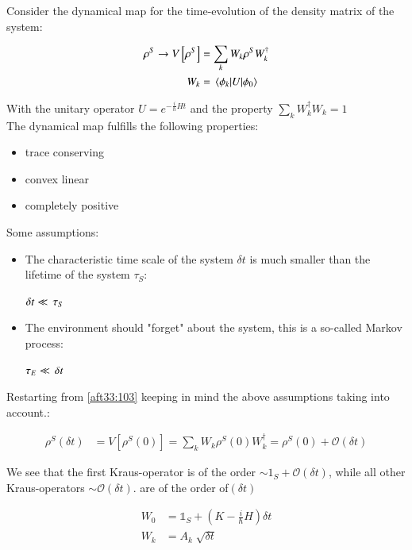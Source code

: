 Consider the dynamical map for the time-evolution of the density matrix of the system:

\begin{align}\label{aft33:103}
{ \rho  }^{ S }\rightarrow V\left[ { \rho  }^{ S } \right]&=\sum _{k}{{W}_{k}}{\rho}^{S}{W}_{k}^{\dagger  }\\
W_{k}&=\matrixel{\phi_{k}}{U}{\phi_{0}}
\end{align}

With the unitary operator $U =e^{-\frac{i}{h}Ht}$ and the property $\sum_{k}{W}_{k}^{\dagger}{W}_{k}=1$\\

The dynamical map fulfills the following properties:

\begin{itemize}
\item trace conserving
\item convex linear
\item completely positive
\end{itemize}
Some assumptions:

\begin{itemize}
\item The characteristic time scale of the system $\delta{t}$ is much smaller than the lifetime of the system $\tau_{S}$:
\begin{center}
$\delta{t}\ll \thinspace \tau_{S}$
\end{center}
\item The environment should "forget" about the system, this is a so-called Markov process:
\begin{center}
$\tau_{E}\ll \thinspace\delta{t} $
\end{center}
\end{itemize}
Restarting from \eqref{aft33:103} keeping in mind the above assumptions taking into account.:

\begin{align}\label{aft33:104}
\rho^{S}(\delta{t})&=V\left[ { \rho  }^{ S }(0) \right] =\sum _{ k }W_{k}{ { \rho  }^{ S } } (0){ W }_{ k }^{ \dagger }={ \rho  }^{ S }(0)+\mathcal{O}(\delta{t})
\end{align}

We see that the first Kraus-operator is of the order $\sim {1}_{S}+\mathcal{O}(\delta{t})$, while all other Kraus-operators $\sim \mathcal{O}(\delta{t})$. are of the order of$(\delta{t})$ 

\begin{align}\label{aft33:105}
W_{0}&={\mathbb{1}_{S}} +\left(K-\frac{i}{\hslash}H\right)\delta{t}\\
W_{k}&=A_{k}\sqrt[]{\delta{t}}
\end{align}

